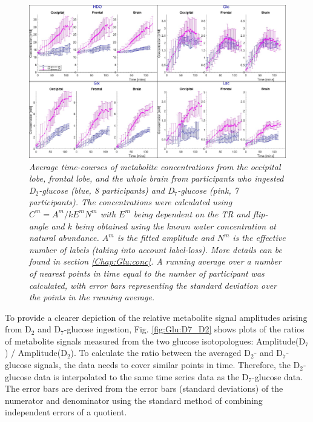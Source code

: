 \begin{figure}
    \centering
    \includegraphics[width = 1\textwidth]{Figures/Glucose/Avg_Conc.png}
    \caption{\textit{Average time-courses of metabolite concentrations from the occipital lobe, frontal lobe, and the whole brain from participants who ingested D$_2$-glucose (blue, 8 participants) and D$_7$-glucose (pink, 7 participants). The concentrations were calculated using $C^m=A^m/kE^mN^m$ with $E^m$ being dependent on the \ac{TR} and flip-angle and $k$ being obtained using the known water concentration at natural abundance. $A^m$ is the fitted amplitude and $N^m$ is the effective number of labels (taking into account label-loss). More details can be found in section \ref{Chap:Glu:conc}. A running average over a number of nearest points in time equal to the number of participant was calculated, with error bars representing the standard deviation over the points in the running average.}}
    \label{fig:Glu:Avg_Conc}
\end{figure}

To provide a clearer depiction of the relative metabolite signal amplitudes arising from D$_2$ and D$_7$-glucose ingestion, Fig. \ref{fig:Glu:D7_D2} shows plots of the ratios of metabolite signals measured from the two glucose isotopologues: Amplitude(D$_7$) / Amplitude(D$_2$). To calculate the ratio between the averaged D$_2$- and D$_7$-glucose signals, the data needs to cover similar points in time. Therefore, the D$_2$-glucose data is interpolated to the same time series data as the D$_7$-glucose data. The error bars are derived from the error bars (standard deviations) of the numerator and denominator using the standard method of combining independent errors of a quotient. 

